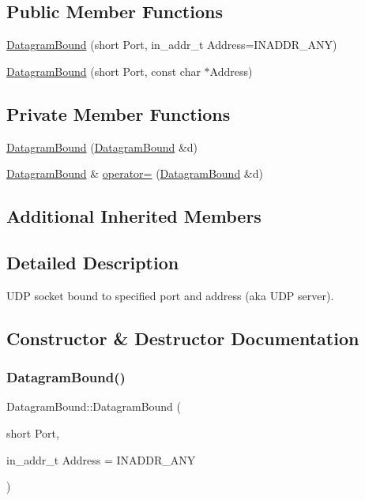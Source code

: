 \subsection*{Public Member Functions}
\begin{DoxyCompactItemize}
\item 
\hyperlink{classDatagramBound_a0a4b53fd787e0c1e038484917655397f}{Datagram\+Bound} (short Port, in\+\_\+addr\+\_\+t Address=I\+N\+A\+D\+D\+R\+\_\+\+A\+NY)
\item 
\hyperlink{classDatagramBound_acc69d2a4bb9bac09b98fec275cc81780}{Datagram\+Bound} (short Port, const char $\ast$Address)
\end{DoxyCompactItemize}
\subsection*{Private Member Functions}
\begin{DoxyCompactItemize}
\item 
\hyperlink{classDatagramBound_a834acb4cd0993871974a6069dceafe9c}{Datagram\+Bound} (\hyperlink{classDatagramBound}{Datagram\+Bound} \&d)
\item 
\hyperlink{classDatagramBound}{Datagram\+Bound} \& \hyperlink{classDatagramBound_a2b499dba8e0be3618e45b75232e050d0}{operator=} (\hyperlink{classDatagramBound}{Datagram\+Bound} \&d)
\end{DoxyCompactItemize}
\subsection*{Additional Inherited Members}


\subsection{Detailed Description}
U\+DP socket bound to specified port and address (aka U\+DP server). 

\subsection{Constructor \& Destructor Documentation}
\mbox{\label{classDatagramBound_a0a4b53fd787e0c1e038484917655397f}} 
\subsubsection{\texorpdfstring{Datagram\+Bound()}{DatagramBound()}\hspace{0.1cm}{\footnotesize\ttfamily [1/3]}}
{\footnotesize\ttfamily Datagram\+Bound\+::\+Datagram\+Bound (\begin{DoxyParamCaption}\item[{short}]{Port,  }\item[{in\+\_\+addr\+\_\+t}]{Address = {\ttfamily INADDR\+\_\+ANY} }\end{DoxyParamCaption})}

